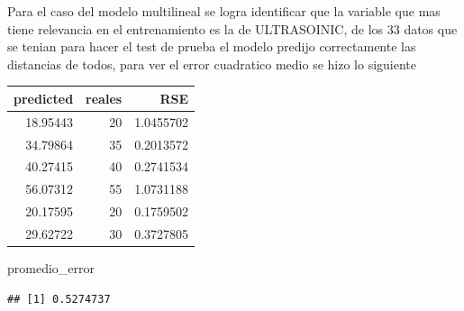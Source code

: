 \documentclass[
]{article}
\newenvironment{Shaded}{\begin{snugshade}}{\end{snugshade}}
\newcommand{\AttributeTok}[1]{\textcolor[rgb]{0.77,0.63,0.00}{#1}}
\newcommand{\DecValTok}[1]{\textcolor[rgb]{0.00,0.00,0.81}{#1}}
\newcommand{\FunctionTok}[1]{\textcolor[rgb]{0.00,0.00,0.00}{#1}}
\newcommand{\NormalTok}[1]{#1}
\newcommand{\OtherTok}[1]{\textcolor[rgb]{0.56,0.35,0.01}{#1}}
\newcommand{\SpecialCharTok}[1]{\textcolor[rgb]{0.00,0.00,0.00}{#1}}
\newcommand{\StringTok}[1]{\textcolor[rgb]{0.31,0.60,0.02}{#1}}
\begin{document}
Para el caso del modelo multilineal se logra identificar que la variable
que mas tiene relevancia en el entrenamiento es la de ULTRASOINIC, de
los 33 datos que se tenian para hacer el test de prueba el modelo
predijo correctamente las distancias de todos, para ver el error
cuadratico medio se hizo lo siguiente

\begin{Shaded}
\end{Shaded}

\begin{longtable}[]{@{}rrr@{}}
\toprule()
predicted & reales & RSE \\
\midrule()
\endhead
18.95443 & 20 & 1.0455702 \\
34.79864 & 35 & 0.2013572 \\
40.27415 & 40 & 0.2741534 \\
56.07312 & 55 & 1.0731188 \\
20.17595 & 20 & 0.1759502 \\
29.62722 & 30 & 0.3727805 \\
\bottomrule()
\end{longtable}

\begin{Shaded}
\begin{Highlighting}[]
\NormalTok{promedio\_error}
\end{Highlighting}
\end{Shaded}

\begin{verbatim}
## [1] 0.5274737
\end{verbatim}
\end{document}
